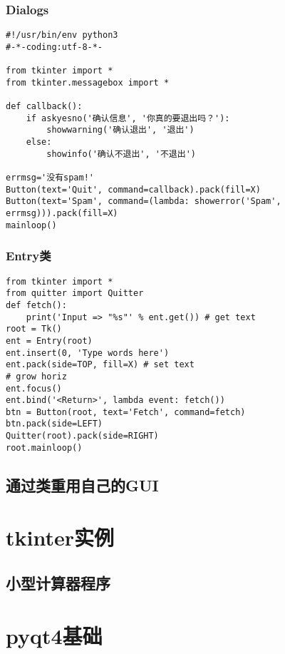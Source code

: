 \documentclass[12pt,oneside]{book}
\begin{document}
\begin{common-format}
\section{Dialogs}
\begin{Verbatim}
#!/usr/bin/env python3
#-*-coding:utf-8-*-

from tkinter import *
from tkinter.messagebox import *

def callback():
    if askyesno('确认信息', '你真的要退出吗？'):
        showwarning('确认退出', '退出')
    else:
        showinfo('确认不退出', '不退出')

errmsg='没有spam!'
Button(text='Quit', command=callback).pack(fill=X)
Button(text='Spam', command=(lambda: showerror('Spam', errmsg))).pack(fill=X)
mainloop()
\end{Verbatim}



\section{Entry类}
\begin{Verbatim}
from tkinter import *
from quitter import Quitter
def fetch():
    print('Input => "%s"' % ent.get()) # get text
root = Tk()
ent = Entry(root)
ent.insert(0, 'Type words here')
ent.pack(side=TOP, fill=X) # set text
# grow horiz
ent.focus()
ent.bind('<Return>', lambda event: fetch())
btn = Button(root, text='Fetch', command=fetch)
btn.pack(side=LEFT)
Quitter(root).pack(side=RIGHT)
root.mainloop()
\end{Verbatim}




\chapter{通过类重用自己的GUI}


\part{tkinter实例}
\chapter{小型计算器程序}







\part{pyqt4基础}

\end{common-format}
\end{document}
